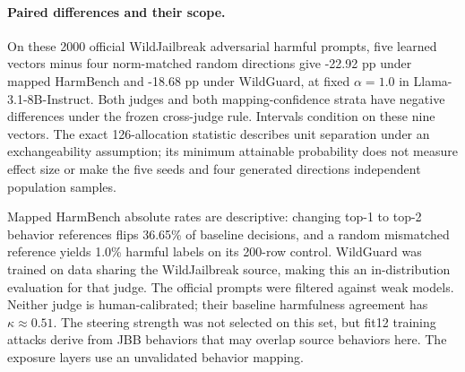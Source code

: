 \paragraph{Paired differences and their scope.}
On these 2000 official WildJailbreak adversarial harmful prompts, five learned vectors minus four norm-matched random directions give -22.92 pp under mapped HarmBench and -18.68 pp under WildGuard, at fixed $\alpha=1.0$ in Llama-3.1-8B-Instruct. Both judges and both mapping-confidence strata have negative differences under the frozen cross-judge rule. Intervals condition on these nine vectors. The exact 126-allocation statistic describes unit separation under an exchangeability assumption; its minimum attainable probability does not measure effect size or make the five seeds and four generated directions independent population samples.

Mapped HarmBench absolute rates are descriptive: changing top-1 to top-2 behavior references flips 36.65\% of baseline decisions, and a random mismatched reference yields 1.0\% harmful labels on its 200-row control. WildGuard was trained on data sharing the WildJailbreak source, making this an in-distribution evaluation for that judge. The official prompts were filtered against weak models. Neither judge is human-calibrated; their baseline harmfulness agreement has $\kappa\approx0.51$. The steering strength was not selected on this set, but fit12 training attacks derive from JBB behaviors that may overlap source behaviors here. The exposure layers use an unvalidated behavior mapping.


